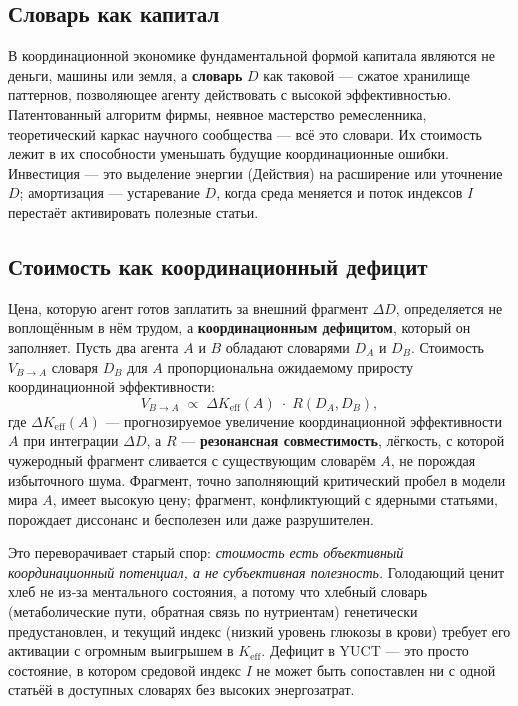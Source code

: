 \documentclass[12pt,a4paper]{article}
\begin{document}
	\subsection{Словарь как капитал}
	
	В координационной экономике фундаментальной формой капитала являются не деньги, машины или земля, а \textbf{словарь} \(D\) как таковой — сжатое хранилище паттернов, позволяющее агенту действовать с высокой эффективностью. Патентованный алгоритм фирмы, неявное мастерство ремесленника, теоретический каркас научного сообщества — всё это словари. Их стоимость лежит в их способности уменьшать будущие координационные ошибки. Инвестиция — это выделение энергии (Действия) на расширение или уточнение \(D\); амортизация — устаревание \(D\), когда среда меняется и поток индексов \(I\) перестаёт активировать полезные статьи.
	
	\subsection{Стоимость как координационный дефицит}
	
	Цена, которую агент готов заплатить за внешний фрагмент \(\Delta D\), определяется не воплощённым в нём трудом, а \textbf{координационным дефицитом}, который он заполняет. Пусть два агента \(A\) и \(B\) обладают словарями \(D_A\) и \(D_B\). Стоимость \(V_{B \rightarrow A}\) словаря \(D_B\) для \(A\) пропорциональна ожидаемому приросту координационной эффективности:
	\[
	V_{B \rightarrow A} \; \propto \; \Delta K_{\mathrm{eff}}(A) \; \cdot \; R(D_A, D_B),
	\]
	где \(\Delta K_{\mathrm{eff}}(A)\) — прогнозируемое увеличение координационной эффективности \(A\) при интеграции \(\Delta D\), а \(R\) — \textbf{резонансная совместимость}, лёгкость, с которой чужеродный фрагмент сливается с существующим словарём \(A\), не порождая избыточного шума. Фрагмент, точно заполняющий критический пробел в модели мира \(A\), имеет высокую цену; фрагмент, конфликтующий с ядерными статьями, порождает диссонанс и бесполезен или даже разрушителен.
	
	Это переворачивает старый спор: \emph{стоимость есть объективный координационный потенциал, а не субъективная полезность.} Голодающий ценит хлеб не из‑за ментального состояния, а потому что хлебный словарь (метаболические пути, обратная связь по нутриентам) генетически предустановлен, и текущий индекс (низкий уровень глюкозы в крови) требует его активации с огромным выигрышем в \(K_{\mathrm{eff}}\). Дефицит в YUCT — это просто состояние, в котором средовой индекс \(I\) не может быть сопоставлен ни с одной статьёй в доступных словарях без высоких энергозатрат.
	
\end{document}
